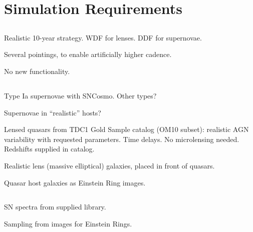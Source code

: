 \section{Simulation Requirements}
\def\secname{\chpname:simulations}
\label{\secname}



\subsection{\OpSim}

Realistic 10-year strategy. WDF for lenses. DDF for supernovae.

Several pointings, to enable artificially higher cadence.

No new functionality.


\subsection{\CatSim}

Type Ia supernovae with SNCosmo. Other types?

Supernovae in ``realistic'' hosts?

Lensed quasars from TDC1 Gold Sample catalog (OM10 subset):
realistic AGN variability with requested parameters. Time delays.
No microlensing needed. Redshifts supplied in catalog.

Realistic lens (massive elliptical) galaxies, placed in front of quasars.

Quasar host galaxies as Einstein Ring images.



\subsection{\PhoSim}

SN spectra from supplied library.

Sampling from images for Einstein Rings.


